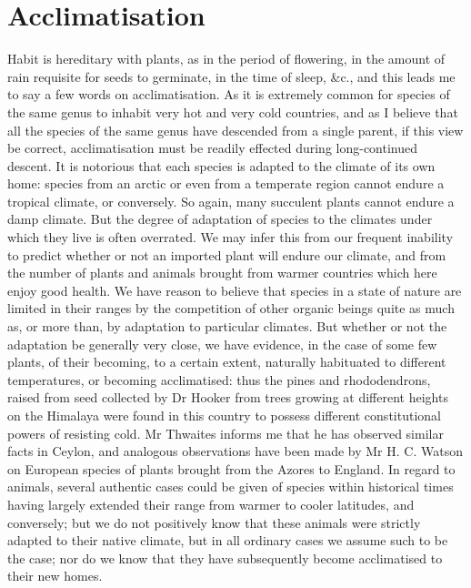 \section{Acclimatisation}
\indent Habit is hereditary with plants, as in the period of flowering, in the amount of rain requisite for seeds to germinate, in the time of sleep, \&c., and this leads me to say a few words on acclimatisation. As it is extremely common for species of the same genus to inhabit very hot and very cold countries, and as I believe that all the species of the same genus have descended from a single parent, if this view be correct, acclimatisation must be readily effected during long-continued descent. It is notorious that each species is adapted to the climate of its own home: species from an arctic or even from a temperate region cannot endure a tropical climate, or conversely. So again, many succulent plants cannot endure a damp climate. But the degree of adaptation of species to the climates under which they live is often overrated. We may infer this from our frequent inability to predict whether or not an imported plant will endure our climate, and from the number of plants and animals brought from warmer countries which here enjoy good health. We have reason to believe that species in a state of nature are limited in their ranges by the competition of other organic beings quite as much as, or more than, by adaptation to particular climates. But whether or not the adaptation be generally very close, we have evidence, in the case of some few plants, of their becoming, to a certain extent, naturally habituated to different temperatures, or becoming acclimatised: thus the pines and rhododendrons, raised from seed collected by Dr Hooker from trees growing at different heights on the Himalaya were found in this country to possess different constitutional powers of resisting cold. Mr Thwaites informs me that he has observed similar facts in Ceylon, and analogous observations have been made by Mr H. C. Watson on European species of plants brought from the Azores to England. In regard to animals, several authentic cases could be given of species within historical times having largely extended their range from warmer to cooler latitudes, and conversely; but we do not positively know that these animals were strictly adapted to their native climate, but in all ordinary cases we assume such to be the case; nor do we know that they have subsequently become acclimatised to their new homes.\\
